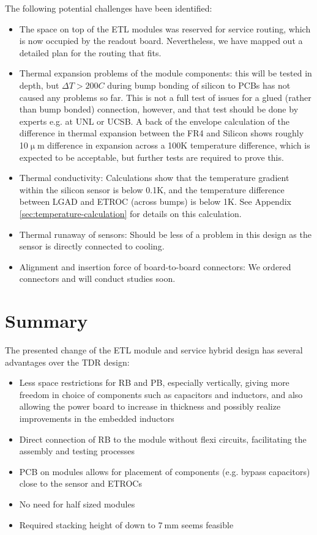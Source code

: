 \documentclass[11pt]{article}
\begin{document}
The following potential challenges have been identified:
\begin{itemize}
  \item The space on top of the ETL modules was reserved for service routing, which is now occupied by the readout board. Nevertheless, we have mapped out a detailed plan for the routing that fits.
  \item Thermal expansion problems of the module components: this will be tested in depth, but $\Delta T > 200C$ during bump bonding of silicon to PCBs has not caused any problems so far. This is not a full test of issues for a glued (rather than bump bonded) connection, however, and that test should be done by experts e.g. at UNL or UCSB. A back of the envelope calculation of the difference in thermal expansion between the FR4 and Silicon shows roughly 10$\upmu$m difference in expansion across a 100K temperature difference, which is expected to be acceptable, but further tests are required to prove this.
  \item Thermal conductivity: Calculations show that the temperature gradient within the silicon sensor is below 0.1K, and the temperature difference between LGAD and ETROC (across bumps) is below 1K. See Appendix \ref{sec:temperature-calculation} for details on this calculation.
  \item Thermal runaway of sensors: Should be less of a problem in this design as the sensor is directly connected to cooling.
  \item Alignment and insertion force of board-to-board connectors: We ordered connectors and will conduct studies soon.
\end{itemize}

\section{Summary}

The presented change of the ETL module and service hybrid design has several advantages over the TDR design:
\begin{itemize}
  \item Less space restrictions for RB and PB, especially vertically, giving more freedom in choice of components such as capacitors and inductors, and also allowing the power board to increase in thickness and possibly realize improvements in the embedded inductors
  \item Direct connection of RB to the module without flexi circuits, facilitating the assembly and testing processes
  \item PCB on modules allows for placement of components (e.g. bypass capacitors) close to the sensor and ETROCs
  \item No need for half sized modules
  \item Required stacking height of down to $7~\mathrm{mm}$ seems feasible
\end{itemize}
\end{document}
